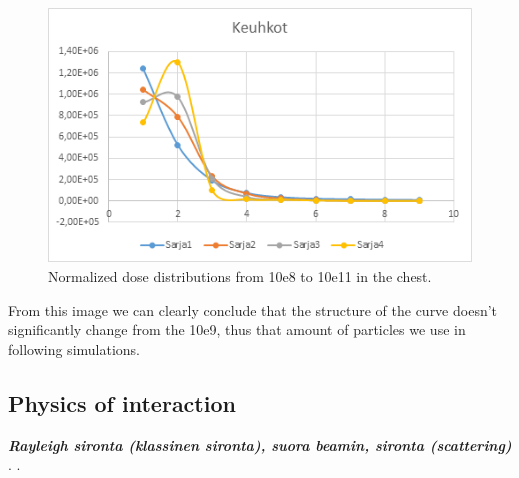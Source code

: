 \documentclass[fleqn,10pt]{SelfArx} %
\begin{document}
\begin{figure}[!hbt]\centering
\includegraphics[width=\linewidth]{PhotonNumber}
\caption{Normalized dose distributions from 10e8 to 10e11 in the chest.}
\label{fig:PhotonNumber}
\end{figure}


From this image we can clearly conclude that the structure of the curve doesn't significantly change from the 10e9, thus that amount of particles we use in following simulations.

\subsection{Physics of interaction}
\textit{\textbf{Rayleigh sironta (klassinen sironta), suora beamin, sironta (scattering)
}}.
.
\end{document}
